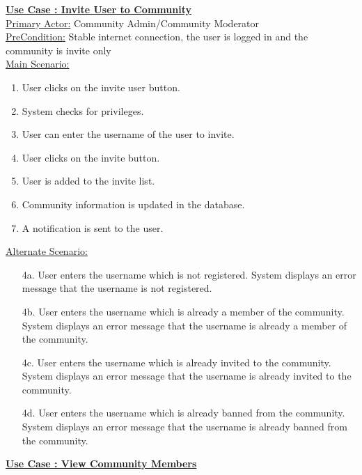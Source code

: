 \documentclass[conference,compsoc]{IEEEtran}
\newcounter{UC}
\newcommand{\nextU}{\stepcounter{UC}\theUC}
\begin{document}
\underline{\textbf{Use Case \nextU: Invite User to Community}}\\

\underline{Primary Actor:} Community Admin/Community Moderator\\

\underline{PreCondition:} Stable internet connection, the user is logged in and the community is invite only\\

\underline{Main Scenario:}\\

\begin{enumerate}
    \item User clicks on the invite user button.
    \item System checks for privileges.
    \item User can enter the username of the user to invite.
    \item User clicks on the invite button.
    \item User is added to the invite list.
    \item Community information is updated in the database.
    \item A notification is sent to the user.
\end{enumerate}

\underline{Alternate Scenario:}\\
\begin{enumerate}
    \item [4a.] User enters the username which is not registered. System displays an error message that the username is not registered.
    \item [4b.] User enters the username which is already a member of the community. System displays an error message that the username is already a member of the community.
    \item [4c.] User enters the username which is already invited to the community. System displays an error message that the username is already invited to the community.
    \item [4d.] User enters the username which is already banned from the community. System displays an error message that the username is already banned from the community.
\end{enumerate}\vspace{0.2cm}

\underline{\textbf{Use Case \nextU: View Community Members}}\\
\end{document}
